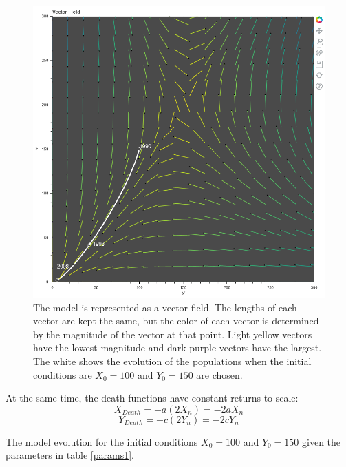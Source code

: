 \documentclass[12pt,a4paper,titlepage]{report}
\begin{document}
		\begin{figure}[htbp]
			\centerline{\includegraphics[scale=.5]{charts/problem3_chart.png}}
			\caption{The model is represented as a vector field. The lengths of each vector are kept the same, but the color of each vector is determined by the magnitude of the vector at that point. Light yellow vectors have the lowest magnitude and dark purple vectors have the largest. The white shows the evolution of the populations when the initial conditions are \(X_{0} = 100\) and \(Y_{0} = 150\) are chosen.}
			\label{fig:p3}
		\end{figure}
		At the same time, the death functions have constant returns to scale:
		\[X_{Death} = -a (2X_{n}) = -2aX_{n}\]
		\[Y_{Death} = -c (2Y_{n}) = -2cY_{n}\]
		\begin{table} 
			\centering
			
			\caption{The model evolution for the initial conditions \(X_{0} = 100\) and \(Y_{0} = 150\) given the parameters in table \ref{params1}.}
			\label{tab:p3}
		\end{table}

		
\end{document}
